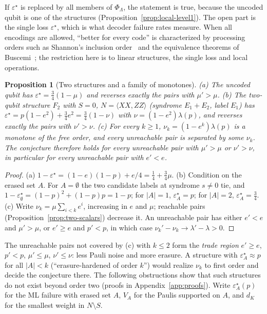 \documentclass[11pt,a4paper]{article}
\theoremstyle{plain}
\newtheorem{proposition}[theorem]{Proposition}
\theoremstyle{definition}
\theoremstyle{remark}
\newcommand{\err}{\varepsilon^{\star}}
\begin{document}
\noindent If $\err$ is replaced by all members of $\Phi_\Lambda$, the statement is true, because the uncoded qubit is one of the structures (Proposition~\ref{prop:local-level1}). The open part is the single loss $\err$, which is what decoder failure rates measure. When all encodings are allowed, ``better for every code'' is characterized by processing orders such as Shannon's inclusion order~\cite{Shannon58} and the equivalence theorems of Buscemi~\cite{Buscemi16,Buscemi18}; the restriction here is to linear structures, the single loss and local operations.

\begin{proposition}[Two structures and a family of monotones]\label{prop:two-structures}
(a) The uncoded qubit has $\err=\tfrac34(1-\mu)$ and reverses exactly the pairs with $\mu'>\mu$.
(b) The two-qubit structure $F_2$ with $S=0$, $N=\langle XX,ZZ\rangle$ (syndrome $E_1+E_2$, label $E_1$) has $\err=p(1-e^2)+\tfrac34e^2=\tfrac34(1-\nu)$ with $\nu=(1-e^2)\lambda(p)$, and reverses exactly the pairs with $\nu'>\nu$.
(c) For every $k\ge1$, $\nu_k=(1-e^k)\lambda(p)$ is a monotone of the free order, and every unreachable pair is separated by some $\nu_k$. The conjecture therefore holds for every unreachable pair with $\mu'>\mu$ or $\nu'>\nu$, in particular for every unreachable pair with $e'<e$.
\end{proposition}
\begin{proof}
(a) $1-\err=(1-e)(1-p)+e/4=\tfrac14+\tfrac34\mu$. (b) Condition on the erased set $A$. For $A=\emptyset$ the two candidate labels at syndrome $s\ne0$ tie, and $1-\err_\emptyset=(1-p)^2+(1-p)p=1-p$; for $|A|=1$, $\err_A=p$; for $|A|=2$, $\err_A=\tfrac34$. (c) Write $\nu_k=\mu\sum_{i<k}e^i$, increasing in $e$ and $\mu$; reachable pairs (Proposition~\ref{prop:two-scalars}) decrease it. An unreachable pair has either $e'<e$ and $\mu'>\mu$, or $e'\ge e$ and $p'<p$, in which case $\nu_k'-\nu_k\to\lambda'-\lambda>0$.
\end{proof}

\noindent The unreachable pairs not covered by (c) with $k\le2$ form the \emph{trade region} $e'\ge e$, $p'<p$, $\mu'\le\mu$, $\nu'\le\nu$: less Pauli noise and more erasure. A structure with $\err_A\approx p$ for all $|A|<k$ (``erasure-hardened of order $k$'') would realize $\nu_k$ to first order and decide the conjecture there. The following obstructions show that such structures do not exist beyond order two (proofs in Appendix~\ref{app:proofs}). Write $\err_A(p)$ for the ML failure with erased set $A$, $V_A$ for the Paulis supported on $A$, and $d_K$ for the smallest weight in $N\setminus S$.
\end{document}
